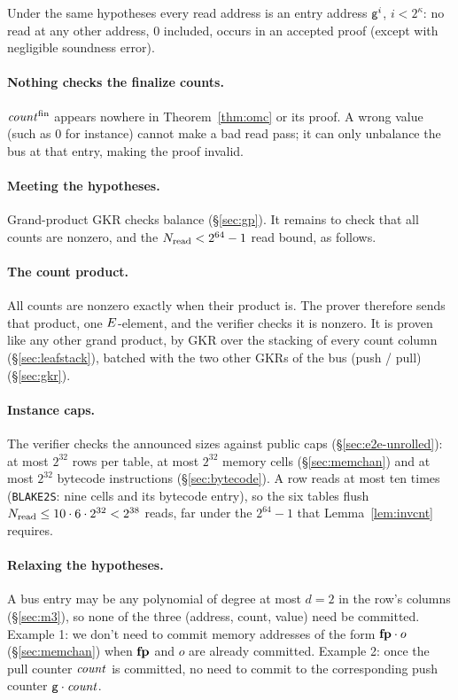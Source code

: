 \begin{corollary}\label{cor:addrrange}
Under the same hypotheses every read address is an entry address $\mathsf{g}^{i}$, $i<2^{\kappa}$: no read at any other address, $0$ included, occurs in an accepted proof (except with negligible soundness error).
\end{corollary}

\paragraph{Nothing checks the finalize counts.} $\mathit{count}^{\mathrm{fin}}$ appears nowhere in Theorem~\ref{thm:omc} or its proof. A wrong value (such as $0$ for instance) cannot make a bad read pass; it can only unbalance the bus at that entry, making the proof invalid.

\paragraph{Meeting the hypotheses.} Grand-product GKR checks balance (\S\ref{sec:gp}). It remains to check that all counts are nonzero, and the $N_{\mathrm{read}}<2^{64}-1$ read bound, as follows.

\paragraph{The count product.} All counts are nonzero exactly when their product is. The prover therefore sends that product, one $E$-element, and the verifier checks it is nonzero. It is proven like any other grand product, by GKR over the stacking of every count column (\S\ref{sec:leafstack}), batched with the two other GKRs of the bus (push / pull) (\S\ref{sec:gkr}).

\paragraph{Instance caps.} The verifier checks the announced sizes against public caps (\S\ref{sec:e2e-unrolled}): at most $2^{32}$ rows per table, at most $2^{32}$ memory cells (\S\ref{sec:memchan}) and at most $2^{32}$ bytecode instructions (\S\ref{sec:bytecode}). A row reads at most ten times (\texttt{BLAKE2S}: nine cells and its bytecode entry), so the six tables flush $N_{\mathrm{read}}\le10\cdot6\cdot2^{32}<2^{38}$ reads, far under the $2^{64}-1$ that Lemma~\ref{lem:invcnt} requires.

\paragraph{Relaxing the hypotheses.} A bus entry may be any polynomial of degree at most $d = 2$ in the row's columns (\S\ref{sec:m3}), so none of the three (address, count, value) need be committed. Example 1: we don't need to commit memory addresses of the form $\mathbf{fp}\cdot o$ (\S\ref{sec:memchan}) when $\mathbf{fp}$ and $o$ are already committed. Example 2: once the pull counter $\mathit{count}$ is committed, no need to commit to the corresponding push counter $\mathsf{g}\cdot\mathit{count}$.

